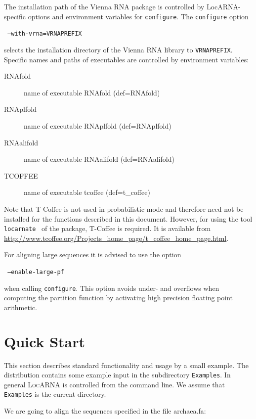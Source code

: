 \documentclass{article}
\newcommand{\LocARNA}{\textsc{LocARNA}}
\newenvironment{ttbox}{%
  \begin{framed}\begin{minipage}{1.0\textwidth}\tt}%
{\end{minipage}\end{framed}\noindent}
\begin{document}
The installation path of the Vienna RNA package is controlled by
LocARNA-specific options and environment variables for
\texttt{configure}.%
The \texttt{configure} option 
\begin{ttbox}
  --with-vrna=VRNAPREFIX
\end{ttbox}
selects the installation directory of the Vienna RNA library to
\texttt{VRNAPREFIX}.
%
Specific names and paths of executables are controlled by environment
variables:
\begin{description}
\item[RNAfold] name of executable RNAfold (def=RNAfold)
\item[RNAplfold] name of executable RNAplfold (def=RNAplfold)
\item[RNAalifold] name of executable RNAalifold (def=RNAalifold)
\item[TCOFFEE] name of executable tcoffee (def=t\_coffee)
\end{description}

Note that T-Coffee is not used in probabilistic mode and therefore
need not be installed for the functions described in this
document. However, for using the tool
\texttt{locarnate}~\cite{Otto:Will:Backofen:_struc_local_multip_align_of_rna:CGB08}
of the package, T-Coffee is required. It is available from
\url{http://www.tcoffee.org/Projects_home_page/t_coffee_home_page.html}.

For aligning large sequences it is advised to use the option
\begin{ttbox}
  --enable-large-pf
\end{ttbox}
when calling \texttt{configure}. This option avoids under- and
overflows when computing the partition function by activating high
precision floating point arithmetic.

\section{Quick Start}

This section describes standard functionality and usage by a small
example. The distribution contains some example input in the
subdirectory \texttt{Examples}. In general \LocARNA{} is controlled
from the command line. We assume that \texttt{Examples} is the current
directory.

We are going to align the sequences specified in the file archaea.fa:
\begin{framed}
   
\end{framed}
\end{document}
